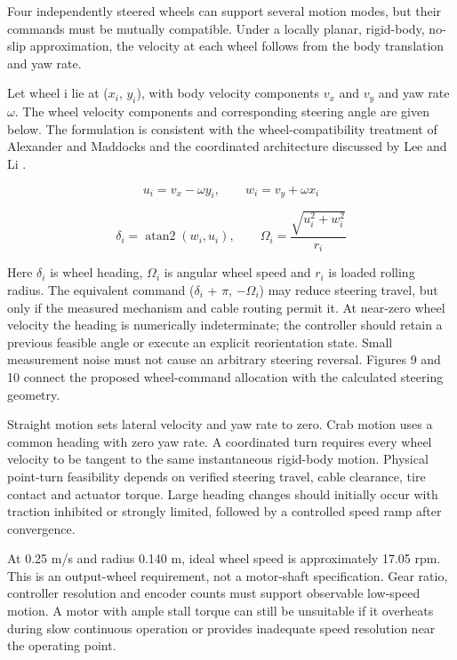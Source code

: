 \documentclass[11pt,a4paper]{article}
\begin{document}
Four independently steered wheels can support several motion modes, but their commands must be mutually compatible. Under a locally planar, rigid-body, no-slip approximation, the velocity at each wheel follows from the body translation and yaw rate.

Let wheel i lie at (\(x_i\), \(y_i\)), with body velocity components \(v_x\) and \(v_y\) and yaw rate \ensuremath{\omega}. The wheel velocity components and corresponding steering angle are given below. The formulation is consistent with the wheel-compatibility treatment of Alexander and Maddocks \citep{alexander1989_c3c6fd} and the coordinated architecture discussed by Lee and Li \citep{lee2015_5bfa55}.

\begin{equation}
\label{eq:1}
u_i=v_x-\omega y_i,\qquad w_i=v_y+\omega x_i
\end{equation}

\begin{equation}
\label{eq:2}
\delta_i=\operatorname{atan2}(w_i,u_i),\qquad \Omega_i=\frac{\sqrt{u_i^2+w_i^2}}{r_i}
\end{equation}

Here \(\delta_i\) is wheel heading, \(\Omega_i\) is angular wheel speed and \(r_i\) is loaded rolling radius. The equivalent command (\(\delta_i\) + \ensuremath{\pi}, \ensuremath{-}\(\Omega_i\)) may reduce steering travel, but only if the measured mechanism and cable routing permit it. At near-zero wheel velocity the heading is numerically indeterminate; the controller should retain a previous feasible angle or execute an explicit reorientation state. Small measurement noise must not cause an arbitrary steering reversal. Figures 9 and 10 connect the proposed wheel-command allocation with the calculated steering geometry.

Straight motion sets lateral velocity and yaw rate to zero. Crab motion uses a common heading with zero yaw rate. A coordinated turn requires every wheel velocity to be tangent to the same instantaneous rigid-body motion. Physical point-turn feasibility depends on verified steering travel, cable clearance, tire contact and actuator torque. Large heading changes should initially occur with traction inhibited or strongly limited, followed by a controlled speed ramp after convergence.

At 0.25 m/s and radius 0.140 m, ideal wheel speed is approximately 17.05 rpm. This is an output-wheel requirement, not a motor-shaft specification. Gear ratio, controller resolution and encoder counts must support observable low-speed motion. A motor with ample stall torque can still be unsuitable if it overheats during slow continuous operation or provides inadequate speed resolution near the operating point.
\end{document}

